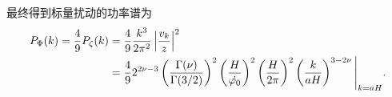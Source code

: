 最终得到标量扰动的功率谱为
\begin{align}
  P_{\Phi}(k)=\frac{4}{9}P_{\zeta}(k) 
  &= \frac{4}{9}\frac{k^3}{2\pi^2}\left\lvert\frac{v_{k}}{z}\right\rvert^2 \\
               &= \frac{4}{9}2^{2\nu -3}\left(\frac{\Gamma(\nu)}{\Gamma(3 /2)}\right)^2
               \left(\frac{H}{\dot{\varphi_0}}\right)^2
               \left(\frac{H}{2\pi}\right)^2
               \left(\frac{k}{aH}\right)^{3-2\nu}
             \Bigg\rvert_{k=aH}.
\end{align}


% 
